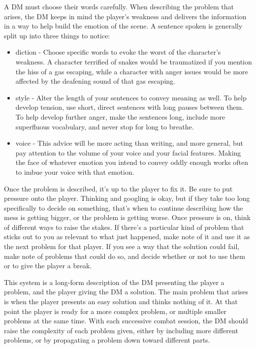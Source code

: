 \documentclass[a4paper]{article}
\begin{document}
A DM must choose their words carefully. When describing the problem that arises, the DM keeps in mind the player's weakness and delivers the information in a way to help build the emotion of the scene. A sentence spoken is generally split up into three things to notice:
\begin{itemize}
\item diction - Choose specific words to evoke the worst of the character's weakness. A character terrified of snakes would be traumatized if you mention the hiss of a gas escaping, while a character with anger issues would be more affected by the deafening sound of that gas escaping.
\item style - Alter the length of your sentences to convey meaning as well. To help develop tension, use short, direct sentences with long pauses between them. To help develop further anger, make the sentences long, include more superfluous vocabulary, and never stop for long to breathe.
\item voice - This advice will be more acting than writing, and more general, but pay attention to the volume of your voice and your facial features. Making the face of whatever emotion you intend to convey oddly enough works often to imbue your voice with that emotion.
\end{itemize}

Once the problem is described, it's up to the player to fix it. Be sure to put pressure onto the player. Thinking and googling is okay, but if they take too long specifically to decide on something, that's when to continue describing how the mess is getting bigger, or the problem is getting worse. Once pressure is on, think of different ways to raise the stakes. If there's a particular kind of problem that sticks out to you as relevant to what just happened, make note of it and use it as the next problem for that player. If you see a way that the solution could fail, make note of problems that could do so, and decide whether or not to use them or to give the player a break.

This system is a long-form description of the DM presenting the player a problem, and the player giving the DM a solution. The main problem that arises is when the player presents an easy solution and thinks nothing of it. At that point the player is ready for a more complex problem, or multiple smaller problems at the same time. With each successive combat session, the DM should raise the complexity of each problem given, either by including more different problems, or by propagating a problem down toward different parts.
\end{document}
